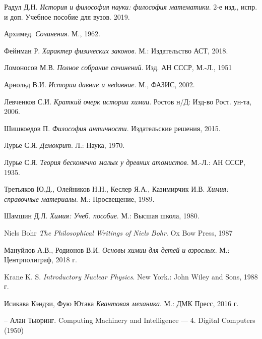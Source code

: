 \begin{thebibliography}{9}

Радул Д.Н. 
\textit{История и философия науки: философия математики}. 2-е изд., испр. и доп. Учебное пособие для вузов. 2019.

Архимед.
\textit{Сочинения}. М., 1962.

Фейнман Р.
\textit{Характер физических законов}. М.: Издательство АСТ, 2018.

Ломоносов М.В.
\textit{Полное собрание сочинений}. Изд. АН СССР, М.-Л., 1951

Арнольд В.И.
\textit{Истории давние и недавние}. М., ФАЗИС, 2002.

Левченков С.И.
\textit{Краткий очерк истории химии}. Ростов н/Д: Изд-во Рост. ун-та, 2006.

Шишкоедов П.
\textit{Философия античности}. Издательские решения, 2015.

Лурье С.Я.
\textit{Демокрит}. Л.: Наука, 1970.

Лурье С.Я.
\textit{Теория бесконечно малых у древних атомистов}.  М.-Л.: АН СССР, 1935.

Третьяков Ю.Д., Олейников Н.Н., Кеслер Я.А., Казимирчик И.В.
\textit{Химия: справочные материалы}. М.: Просвещение, 1989.

Шамшин Д.Л.
\textit{Химия: Учеб. пособие}. М.: Высшая школа, 1980.

Niels Bohr
\textit{The Philosophical Writings of Niels Bohr}. Ox Bow Press, 1987

Мануйлов А.В., Родионов В.И.
\textit{Основы химии для детей и взрослых}. М.: Центрполиграф, 2018 г.

Krane K. S. 
\textit{Introductory Nuclear Physics}. New York.: John Wiley and Sons, 1988 г.

Исикава Кэндзи, Фую Ютака
\textit{Квантовая механика}. М.: ДМК Пресс, 2016 г.

-- Алан Тьюринг. Computing Machinery and Intelligence — 4. Digital Computers (1950)



\end{thebibliography}
